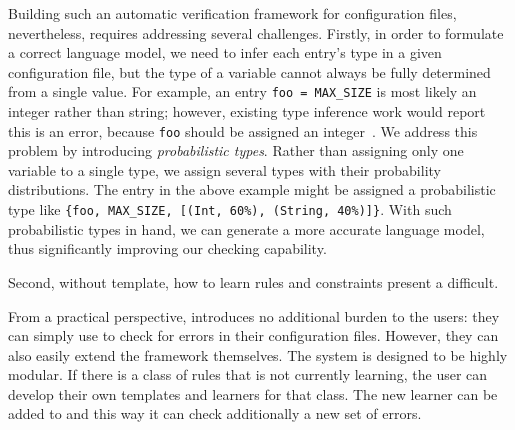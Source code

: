 Building such an automatic verification framework for
configuration files, nevertheless, requires addressing several challenges. 
Firstly, in order to formulate a correct language model, 
we need to infer each entry's type in a given configuration file, but 
the type of a variable cannot always be fully determined 
from a single value. 
For example, an entry {\tt foo = MAX\_SIZE} is most likely
an integer rather than string; however, existing type inference 
work would report this is an error, because {\tt foo} should be assigned
an integer~\cite{zhang14encore}.  We address this problem by introducing 
{\emph{probabilistic types}}.
Rather than assigning only one variable to a single type, 
we assign several types with their probability distributions. 
The entry in the above example might be assigned 
a probabilistic type like 
{\tt \{foo, MAX\_SIZE, [(Int, 60\%), (String, 40\%)]\}}.
With such probabilistic types in hand,
we can generate a more accurate language model,
thus significantly improving our checking capability.

Second, without template, how to learn rules and constraints present
a difficult. 


From a practical perspective, 
\app introduces no additional burden 
to the users: they can simply use \app to check for errors in their
configuration files. However, they can also easily extend the framework
themselves. The system is designed to be highly modular. If there is a
class of rules that \app is not currently learning, the user can develop
their own templates and learners for that class. The new learner can be
added to \app and this way it can check additionally a new set of
errors.

